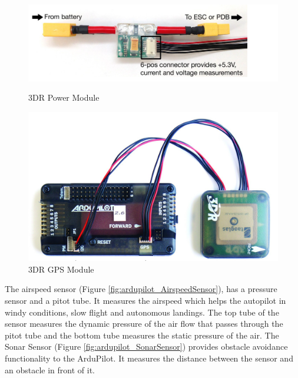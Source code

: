 \documentclass[english,fira]{ist-report}
\begin{document}
\begin{figure}[h]
  \centering
  \begin{minipage}[t]{0.5\linewidth}
    \centering
    \includegraphics[width=\textwidth]{graphics/AVIONICS/ardupilot1.png}
    \caption{3DR Power Module}
    \label{fig:ardupilot_powermodule}
  \end{minipage}%
  \begin{minipage}[t]{0.5\linewidth}
    \centering
    \includegraphics[width=\textwidth]{graphics/AVIONICS/ardupilot2.png}
    \caption{3DR GPS Module}
    \label{fig:ardupilot_gpsmodule}
  \end{minipage}
\end{figure}

The airspeed sensor (Figure \ref{fig:ardupilot_AirspeedSensor}), has a pressure sensor and a pitot tube. It measures the airspeed which helps the autopilot in windy conditions, slow flight and autonomous landings. The top tube of the sensor measures the dynamic pressure of the air flow that passes through the pitot tube and the bottom tube measures the static pressure of the air. The Sonar Sensor (Figure \ref{fig:ardupilot_SonarSensor}) provides obstacle avoidance functionality to the ArduPilot. It measures the distance between the sensor and an obstacle in front of it.
\end{document}
